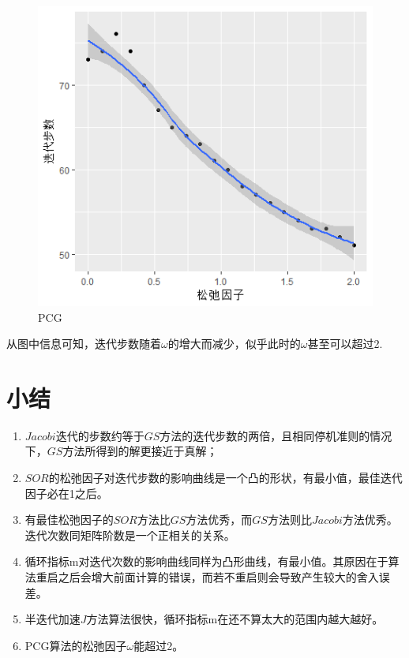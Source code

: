\documentclass[10pt]{article}
\begin{document}
\begin{enumerate}
\begin{figure}[H]
  \includegraphics[width=.9\textwidth]{lastone.png}
  \caption{PCG}
  \end{figure}
  从图中信息可知，迭代步数随着$\omega$的增大而减少，似乎此时的$\omega$甚至可以超过2.
  \end{enumerate}
  \newpage
  \pagestyle{fancynotes}
  \part{小结}
  \begin{enumerate}
  \item $Jacobi$迭代的步数约等于$GS$方法的迭代步数的两倍，且相同停机准则的情况下，$GS$方法所得到的解更接近于真解；
  \item $SOR$的松弛因子对迭代步数的影响曲线是一个凸的形状，有最小值，最佳迭代因子必在1之后。
  \item 有最佳松弛因子的$SOR$方法比$GS$方法优秀，而$GS$方法则比$Jacobi$方法优秀。迭代次数同矩阵阶数是一个正相关的关系。
  \item 循环指标m对迭代次数的影响曲线同样为凸形曲线，有最小值。其原因在于算法重启之后会增大前面计算的错误，而若不重启则会导致产生较大的舍入误差。
  \item 半迭代加速$J$方法算法很快，循环指标m在还不算太大的范围内越大越好。
  \item PCG算法的松弛因子$\omega$能超过2。
  \end{enumerate}
\end{document}
